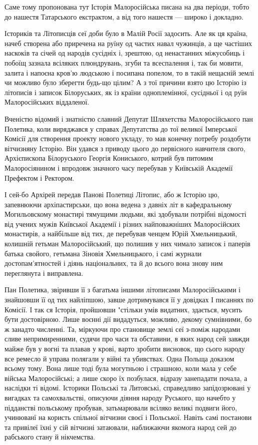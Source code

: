 Саме тому пропонована тут Історія Малоросійська писана на два періоди, тобто до
нашестя Татарського екстрактом, а від того нашестя — широко і докладно.

Істориків та Літописців сеї доби було в Малій Росії задосить. Але як ця країна,
начеб створена або приречена на руїну од частих навал чужинців, а ще частіших
наскоків та січей од народів сусідніх і, зрештою, од ненастанних міжусобиць і
побоїщ зазнала всіляких плюндрувань, згуби та всеспалення і, так би мовити,
залита і напоєна кров'ю людською і посипана попелом, то в такій нещасній землі
чи можливо було зберегти будь-що цілим? А з тої причини взято цю Історію із
літописів і записок Білоруських, як із країни одноплемінної, сусідньої і од
руїн Малоросійських віддаленої.

Вченістю відомий і знатністю славний Депутат Шляхетства Малоросійського пан
Полетика, коли виряджався у справах Депутатства до тої великої Імперської
Комісії для створення проекту нового укладу, то мав конечну потребу роздобути
вітчизняну Історію. Він удався з приводу цього до первісного навчителя свого,
Архієпископа Білоруського Георгія Кониського, котрий був питомим Малоросіянином
і впродовж значного часу перебував у Київській Академії Префектом і Ректором.

І сей-бо Архірей передав Панові Полетиці Літопис, або ж Історію цю, запевнюючи
архіпастирськи, що вона ведена з давніх літ в кафедральному Могильовскому
монастирі тямущими людьми, які здобували потрібні відомості від учених мужів
Київської Академії і різних найповажніших Малоросійских монастирів, а найбільше
від тих, де перебував ченцем Юрій Хмельницький, колишній гетьман
Малоросійський, що полишив у них чимало записок і паперів батька свойого,
гетьмана Зіновія Хмельницького, і самі журнали достопам'ятностей і діянь
національних, та й до всього вона знову ним переглянута і виправлена.

Пан Полетика, звіривши її з багатьма іншими літописами Малоросійськими і
знайшовши її од тих найліпшою, завше дотримувався її у довідках І писаннях по
Комісії. І так ся Історія, пройшовши "стільки умів видатних, здається, мусить
бути достовірною. Лише воєнні дії видадуться, можливо, декому сумнівними, бо ж
занадто численні. Та, міркуючи про становище землі сеї з-поміж народами сливе
непримиренними, судячи про часи та обставини, в яких народ сей завжди майже був
у вогні та плавав у крові, варто зробити висновок, що сього народу все ремесло
й управа полягали у війні та убивствах. Одна Польща доказом всьому тому. Вона
лише тоді була могутньою і страшною, коли мала у себе війська Малоросійські; а
лише скоро їх позбулася, відразу занепадати почала, а наслідки ті відомі.
Історики Польські та Литовські, справедливо запідозрювані у вигадках та
самохвальстві, описуючи діяння народу Руського, що начебто у підданстві
польському пробував, затьмарювали всіляко великі подвиги його, учинюванї на
користь спільної вітчизни своєї і Польської. Навіть самі постанови та привілеї
їхні у сій вітчизні затаювали, наближаючи якомога народ сей до рабського стану
й нікчемства. 

